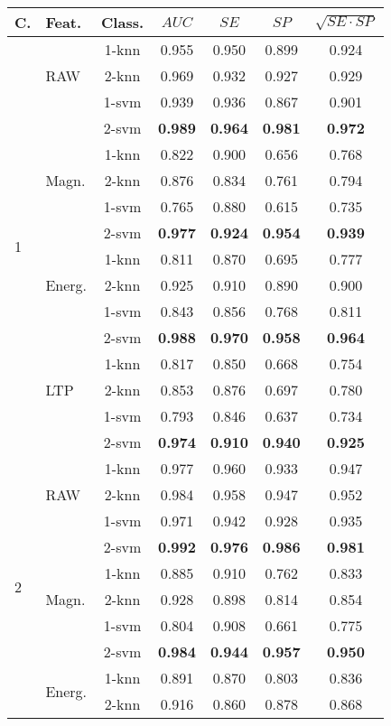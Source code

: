\documentclass[twocolumn]{svjour3}          \smartqed  \usepackage[draft]{hyperref}
\begin{document}
\begin{table}[tb]
\scriptsize
\centering
\begin{tabular}{llccccc}
C.&	Feat.&Class.	&	$AUC$ &	$SE$ &	$SP$	&	$\sqrt{SE\cdot SP}$ \\
\hline \multirow{16}{*}{1}	&\multirow{3}{*}{RAW}	&1-knn&	0.955&	0.950&	0.899&	0.924\\ 
&&2-knn&	0.969&	0.932&	0.927&	0.929\\ 
&&1-svm&	0.939&	0.936&	0.867&	0.901\\ 
&&2-svm&	\bf{0.989}&	\bf{0.964}&	\bf{0.981}&	\bf{0.972}\\ 
[2pt] 
&\multirow{3}{*}{Magn.}	&1-knn&	0.822&	0.900&	0.656&	0.768\\ 
&&2-knn&	0.876&	0.834&	0.761&	0.794\\ 
&&1-svm&	0.765&	0.880&	0.615&	0.735\\ 
&&2-svm&	\bf{0.977}&	\bf{0.924}&	\bf{0.954}&	\bf{0.939}\\ 
[2pt] 
&\multirow{3}{*}{Energ.}	&1-knn&	0.811&	0.870&	0.695&	0.777\\ 
&&2-knn&	0.925&	0.910&	0.890&	0.900\\ 
&&1-svm&	0.843&	0.856&	0.768&	0.811\\ 
&&2-svm&	\bf{0.988}&	\bf{0.970}&	\bf{0.958}&	\bf{0.964}\\ 
[2pt] 
&\multirow{3}{*}{LTP}	&1-knn&	0.817&	0.850&	0.668&	0.754\\ 
&&2-knn&	0.853&	0.876&	0.697&	0.780\\ 
&&1-svm&	0.793&	0.846&	0.637&	0.734\\ 
&&2-svm&	\bf{0.974}&	\bf{0.910}&	\bf{0.940}&	\bf{0.925}\\ 
[2pt] 
\hline 
\multirow{16}{*}{2}	&\multirow{3}{*}{RAW}	&1-knn&	0.977&	0.960&	0.933&	0.947\\ 
&&2-knn&	0.984&	0.958&	0.947&	0.952\\ 
&&1-svm&	0.971&	0.942&	0.928&	0.935\\ 
&&2-svm&	\bf{0.992}&	\bf{0.976}&	\bf{0.986}&	\bf{0.981}\\ 
[2pt] 
&\multirow{3}{*}{Magn.}	&1-knn&	0.885&	0.910&	0.762&	0.833\\ 
&&2-knn&	0.928&	0.898&	0.814&	0.854\\ 
&&1-svm&	0.804&	0.908&	0.661&	0.775\\ 
&&2-svm&	\bf{0.984}&	\bf{0.944}&	\bf{0.957}&	\bf{0.950}\\ 
[2pt] 
&\multirow{3}{*}{Energ.}	&1-knn&	0.891&	0.870&	0.803&	0.836\\ 
&&2-knn&	0.916&	0.860&	0.878&	0.868\\ 

\end{tabular}
\end{table}
\end{document}
